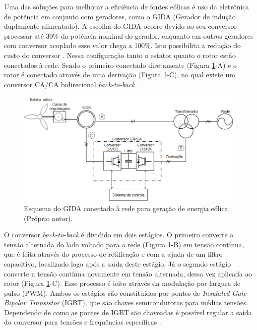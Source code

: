 	Uma das soluções para melhorar a eficiência de fontes eólicas é uso da eletrônica de potência em conjunto com geradores, como o GIDA (Gerador de indução duplamente alimentado).  A escolha do GIDA ocorre devido ao seu conversor processar até 30\% da potência nominal do gerador, enquanto em outros geradores com conversor acoplado esse valor chega a 100\%. Isto possibilita a redução do custo do conversor \cite{dattacomparacao,simoesrenewableinduction}. Nessa configuração tanto o estator quanto o rotor estão conectados à rede. Sendo o primeiro conectado diretamente (Figura \ref{figura:gida_esquematico}-A) e o rotor  é conectado através de uma derivação (Figura \ref{figura:gida_esquematico}-C), no qual existe um conversor CA/CA bidirecional \emph{back-to-back} \cite{heliodfig}.
	\begin{figure}[h]
		\centering
		\includegraphics[width=1\textwidth]{Figuras/gida_esquematico.png}
		\caption{Esquema do GIDA conectado à rede para geração de energia eólica (Próprio autor).}
		\label{figura:gida_esquematico}
	\end{figure}

	O conversor \emph{back-to-back} é dividido em dois estágios. O primeiro converte a tensão alternada do lado voltado para a rede (Figura \ref{figura:gida_esquematico}-B) em tensão contínua, que é feita através do processo de retificação e com a ajuda de um filtro capacitivo, localizado logo após a saída deste estágio. Já o segundo estágio converte a tensão contínua novamente em tensão alternada, dessa vez aplicada ao rotor (Figura \ref{figura:gida_esquematico}-C). Esse processo é feito através da modulação por largura de pulso (PWM). Ambos os estágios são constituídos por pontes de \emph{Insulated Gate Bipolar Transistor} (IGBT), que são chaves semicondutoras para médias tensões. Dependendo de como as pontes de IGBT são chaveadas é possível regular a saída do conversor para tensões e frequências específicas \cite{alfeu}. 
	
